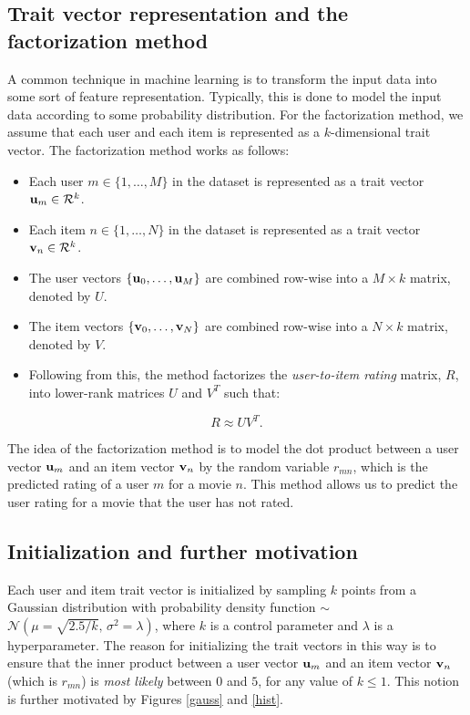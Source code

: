 \documentclass{article}
\begin{document}
\subsection{Trait vector representation and the factorization method}
A common technique in machine learning is to transform the input data into some sort of feature representation.
Typically, this is done to model the input data according to some probability distribution.
For the factorization method, we assume that each user and each item is represented as a $k$-dimensional trait vector.
The factorization method works as follows:
\begin{itemize}
    \item Each user $m \in \{1, \dots, M\}$ in the dataset is represented as a trait vector $\vb{u}_m \in \mathcal{R}^k$.
    \item Each item $n \in \{1, \dots, N\}$ in the dataset is represented as a trait vector $\vb{v}_n \in \mathcal{R}^k$.
    \item The user vectors $\{\vb{u}_0, \dots, \vb{u}_M\}$ are combined row-wise into a $M \times k$ matrix, denoted by $U$.
    \item The item vectors $\{\vb{v}_0, \dots, \vb{v}_N\}$ are combined row-wise into a $N \times k$ matrix, denoted by $V$.
    \item Following from this, the method factorizes the \emph{user-to-item rating} matrix, $R$, 
    into lower-rank matrices $U$ and $V^T$ such that:
\end{itemize}

\begin{equation} \label{mf}
    R\approx UV^T\text{.}
\end{equation}

The idea of the factorization method is to model the dot product between a user vector $\vb{u}_m$ 
and an item vector $\vb{v}_n$ by the random variable $r_{mn}$, which is the predicted rating of a user $m$ for a movie $n$.
This method allows us to predict the user rating for a movie that the user has not rated.

\subsection{Initialization and further motivation}
Each user and item trait vector is initialized by sampling $k$ points from a Gaussian distribution
with probability density function $\sim$ $\mathcal{N}(\mu = \sqrt{2.5/k},\, \sigma^2 = \lambda)$, where $k$ is a control parameter and 
$\lambda$ is a hyperparameter. The reason for initializing the trait vectors in this way is to ensure that 
the inner product between a user vector $\vb{u}_m$ and an item vector $\vb{v}_n$ (which is $r_{mn}$) is \emph{most likely} between $0$ and $5$, for any value of $k \leq 1$.
This notion is further motivated by Figures \ref{gauss} and \ref{hist}.
\\\\
\end{document}
